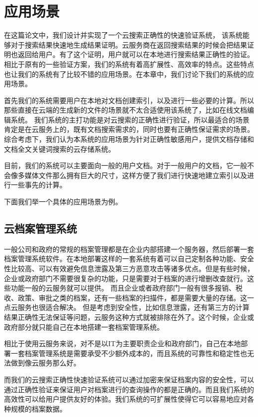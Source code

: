 \chapter{应用场景}
\label{chap:application}
在这篇论文中，我们设计并实现了一个云搜索正确性的快速验证系统，
该系统能够对于搜索结果快速地生成结果证明。云服务商在返回搜索结果的时候会把结果证明也返回给用户。有了这个证明，用户就可以在本地进行搜索结果正确性的验证。相比于原有的一些验证方案，我们的系统有着高扩展性、高效率的特点。这些特点也让我们的系统有了比较不错的应用场景。在本章中，我们讨论下我们的系统的应用场景。

首先我们的系统需要用户在本地对文档创建索引，以及进行一些必要的计算。所以那些直接在云端的生成新的文件的场景就不太合适使用该系统了，比如在线文档编辑系统。
我们系统的主打功能是对云搜索的正确性进行验证，所以最适合的场景肯定是在云服务上的，既有文档搜索需求的，同时也要有正确性保证需求的场景。
综合考虑下，我们认为本系统的应用场景为针对正确性敏感用户，提供文档存储和文档全文关键词搜索的云存储系统。

目前，我们的系统可以主要面向一般的用户文档。对于一般用户的文档，它一般不会像多媒体文件那么拥有巨大的尺寸，这样方便了我们进行快速地建立索引以及进行一些事先的计算。

下面我们举一个具体的应用场景为例。

\section{云档案管理系统}
一般公司和政府的常规的档案管理都是在企业内部搭建一个服务器，然后部署一套档案管理系统软件。在本地部署这样的一套系统有着可以自己定制各种功能、安全性比较高、可以有效避免信息泄露及第三方恶意攻击等诸多优点。但是有些时候，企业或政府部门不需要很复杂的功能，只是需要对于档案的进行增删改查就行。这些功能一般的云服务就可以提供。
而且企业或者政府部门一般有很多报销、税收、政策、审批之类的档案，还有一些档案的扫描件，都是需要大量的存储。这一点云服务也很适合解决。
但是考虑到安全性，比如信息泄露，还有第三方的计算结果正确性无法保证等问题，云服务这种方式就被排除在外了。这个时候，企业或政府部分就只能自己在本地搭建一套档案管理系统。

相比于使用云服务来说，对不是以IT为主要职责企业和政府部门，自己在本地部署一套档案管理系统是需要承受不少额外成本的，而且系统的可靠性和稳定性也无法做到像云服务那么好。


而我们的云搜索正确性快速验证系统可以通过加密来保证档案内容的安全性，可以通过正确性验证来保证用户对档案进行的查询操作的都是正确的。而且我们系统的高效性可以给用户提供友好的体验。我们系统的可扩展性使得它可以容易地应对各种规模的档案数据。

